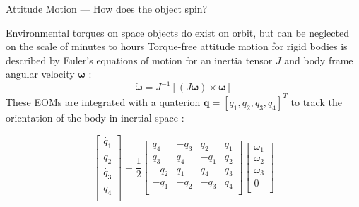 \documentclass{beamer}
\begin{document}
\begin{frame}{Attitude Motion --- How does the object spin?}
    \begin{outline}
        \1 Environmental torques on space objects do exist on orbit, but can be neglected on the scale of minutes to hours
        \1 Torque-free attitude motion for rigid bodies is described by Euler's equations of motion for an inertia tensor $J$ and body frame angular velocity $\mathbf{\omega}$ \cite{crassidis1ed}:
        \begin{equation*}
            \dot{\mathbf{\omega}} = J^{-1} \left[ \left(J \mathbf{\omega} \right) \times \mathbf{\omega} \right]
        \end{equation*}
        \1 These EOMs are integrated with a quaterion $\mathbf{q} = \left[q_1, q_2, q_3, q_4 \right]^T$ to track the orientation of the body in inertial space \cite{crassidis1ed}:

        \begin{equation*}
            \left[\begin{matrix}\dot{q_1}\\\dot{q_2}\\\dot{q_3}\\\dot{q_4}\\\end{matrix}\right]
            =
            \frac{1}{2}\left[\begin{matrix}q_4&-q_3&q_2&q_1\\q_3&q_4&-q_1&q_2\\-q_2&q_1&q_4&q_3\\-q_1&-q_2&-q_3&q_4\\\end{matrix}\right]
            \left[\begin{matrix}\omega_1\\\omega_2\\\omega_3\\0\\\end{matrix}\right]        
        \end{equation*}
    \end{outline}
\end{frame}
\end{document}
